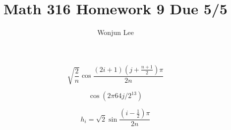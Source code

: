 \documentclass[11pt]{amsart}
\theoremstyle{remark}
\begin{document}
\title[Homework 2]{Math 316 Homework 9 Due 5/5}

\author{Wonjun Lee}

\maketitle
\onehalfspacing
\large



$$\sqrt{\frac{2}{n}}\cos\frac{(2i+1)(j+\frac{n+1}{2})\pi}{2n}$$

$$\cos(2\pi64j/2^{13})$$

$$h_i=\sqrt{2}\sin\frac{(i-\frac{1}{2})\pi}{2n}$$
\end{document}
